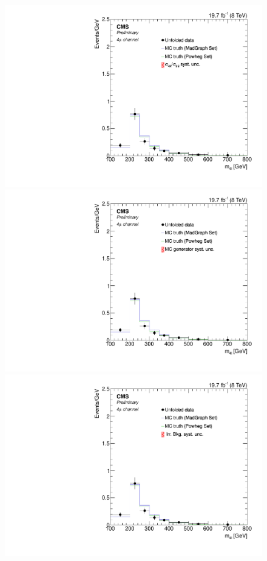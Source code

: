 \begin{figure}[hbtp]
  \begin{center}
    \includegraphics[width=0.8\cmsFigWidth]{Figures/Unfolding/Systematics/ZZTo4m_Mass_qqgg_Pow_fr}     
    \includegraphics[width=0.8\cmsFigWidth]{Figures/Unfolding/Systematics/ZZTo4m_Mass_MCgen_Pow_fr}     
    \includegraphics[width=0.8\cmsFigWidth]{Figures/Unfolding/Systematics/ZZTo4m_Mass_IrrBkg_Pow_fr}

\end{center}
\end{figure}

